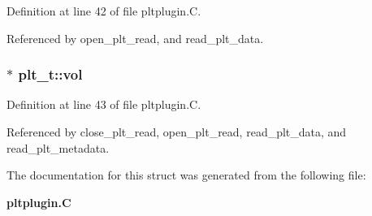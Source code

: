 Definition at line 42 of file pltplugin.C.

Referenced by open\_\-plt\_\-read, and read\_\-plt\_\-data.
\subsubsection{$\ast$ plt\_\-t::vol}\label{structplt__t_m3}




Definition at line 43 of file pltplugin.C.

Referenced by close\_\-plt\_\-read, open\_\-plt\_\-read, read\_\-plt\_\-data, and read\_\-plt\_\-metadata.

The documentation for this struct was generated from the following file:\begin{CompactItemize}
\item 
{\bf pltplugin.C}\end{CompactItemize}
